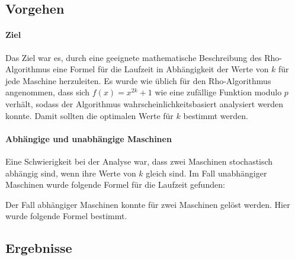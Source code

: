 \documentclass[a4paper, extrafontsizes, ngerman, 25pt]{memoir}
\begin{document}
\newpage

\subsection{Vorgehen}

\paragraph*{Ziel} Das Ziel war es, durch eine geeignete mathematische Beschreibung des Rho-Algorithmus eine Formel für die Laufzeit in Abhängigkeit der Werte von $k$ für jede Maschine herzuleiten. Es wurde wie üblich für den Rho-Algorithmus angenommen, dass sich $f(x) = x^{2k} + 1$ wie eine zufällige Funktion modulo $p$ verhält, sodass der Algorithmus wahrscheinlichkeitsbasiert analysiert werden konnte. Damit sollten die optimalen Werte für $k$ bestimmt werden.

\paragraph*{Abhängige und unabhängige Maschinen} Eine Schwierigkeit bei der Analyse war, dass zwei Maschinen stochastisch abhängig sind, wenn ihre Werte von $k$ gleich sind. Im Fall unabhängiger Maschinen wurde folgende Formel für die Laufzeit gefunden:

\begin{figure}[H]
    \centering
    
\end{figure}

\noindent Der Fall abhängiger Maschinen konnte für zwei Maschinen gelöst werden. Hier wurde folgende Formel bestimmt.

\begin{figure}[H]
    \centering
    
\end{figure}

\newpage

\subsection{Ergebnisse}
\end{document}

